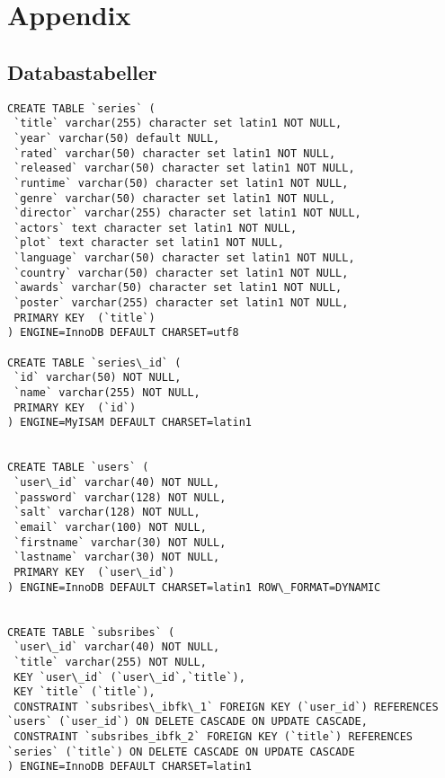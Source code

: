 \appendix
\chapter{Appendix}
\section{Databastabeller}
\begin{lstlisting}
CREATE TABLE `series` (
 `title` varchar(255) character set latin1 NOT NULL,
 `year` varchar(50) default NULL,
 `rated` varchar(50) character set latin1 NOT NULL,
 `released` varchar(50) character set latin1 NOT NULL,
 `runtime` varchar(50) character set latin1 NOT NULL,
 `genre` varchar(50) character set latin1 NOT NULL,
 `director` varchar(255) character set latin1 NOT NULL,
 `actors` text character set latin1 NOT NULL,
 `plot` text character set latin1 NOT NULL,
 `language` varchar(50) character set latin1 NOT NULL,
 `country` varchar(50) character set latin1 NOT NULL,
 `awards` varchar(50) character set latin1 NOT NULL,
 `poster` varchar(255) character set latin1 NOT NULL,
 PRIMARY KEY  (`title`)
) ENGINE=InnoDB DEFAULT CHARSET=utf8

CREATE TABLE `series\_id` (
 `id` varchar(50) NOT NULL,
 `name` varchar(255) NOT NULL,
 PRIMARY KEY  (`id`)
) ENGINE=MyISAM DEFAULT CHARSET=latin1


CREATE TABLE `users` (
 `user\_id` varchar(40) NOT NULL,
 `password` varchar(128) NOT NULL,
 `salt` varchar(128) NOT NULL,
 `email` varchar(100) NOT NULL,
 `firstname` varchar(30) NOT NULL,
 `lastname` varchar(30) NOT NULL,
 PRIMARY KEY  (`user\_id`)
) ENGINE=InnoDB DEFAULT CHARSET=latin1 ROW\_FORMAT=DYNAMIC


CREATE TABLE `subsribes` (
 `user\_id` varchar(40) NOT NULL,
 `title` varchar(255) NOT NULL,
 KEY `user\_id` (`user\_id`,`title`),
 KEY `title` (`title`),
 CONSTRAINT `subsribes\_ibfk\_1` FOREIGN KEY (`user_id`) REFERENCES `users` (`user_id`) ON DELETE CASCADE ON UPDATE CASCADE,
 CONSTRAINT `subsribes_ibfk_2` FOREIGN KEY (`title`) REFERENCES `series` (`title`) ON DELETE CASCADE ON UPDATE CASCADE
) ENGINE=InnoDB DEFAULT CHARSET=latin1


\end{lstlisting}

